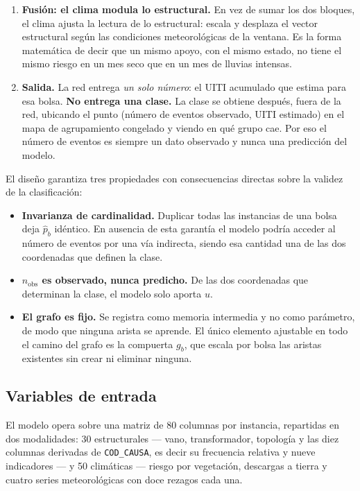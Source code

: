 \documentclass[11pt,a4paper]{article}
\begin{document}
\begin{bloquenuevo}
\begin{enumerate}[itemsep=0.3em]
  \item \textbf{Fusión: el clima modula lo estructural.} En vez de sumar los dos bloques, el
        clima ajusta la lectura de lo estructural: escala y desplaza el vector estructural
        según las condiciones meteorológicas de la ventana. Es la forma matemática de decir
        que un mismo apoyo, con el mismo estado, no tiene el mismo riesgo en un mes seco que
        en un mes de lluvias intensas.

  \item \textbf{Salida.} La red entrega \emph{un solo número}: el UITI acumulado que estima
        para esa bolsa. \textbf{No entrega una clase.} La clase se obtiene después, fuera de
        la red, ubicando el punto (número de eventos observado, UITI estimado) en el mapa de
        agrupamiento congelado y viendo en qué grupo cae. Por eso el número de eventos es
        siempre un dato observado y nunca una predicción del modelo.
\end{enumerate}
\end{bloquenuevo}

El diseño garantiza tres propiedades con consecuencias directas sobre la validez de la
clasificación:

\begin{itemize}
  \item \textbf{Invarianza de cardinalidad.} Duplicar todas las instancias de una bolsa deja
        $\hat{p}_b$ idéntico. En ausencia de esta garantía el modelo podría acceder al número
        de eventos por una vía indirecta, siendo esa cantidad una de las dos coordenadas que
        definen la clase.
  \item \textbf{$n_{\text{obs}}$ es observado, nunca predicho.} De las dos coordenadas que
        determinan la clase, el modelo solo aporta $u$.
  \item \textbf{El grafo es fijo.} Se registra como memoria intermedia y no como parámetro, de
        modo que ninguna arista se aprende. El único elemento ajustable en todo el camino del
        grafo es la compuerta $g_b$, que escala por bolsa las aristas existentes sin crear ni
        eliminar ninguna.
\end{itemize}

\subsection{Variables de entrada}

El modelo opera sobre una matriz de 80 columnas por instancia, repartidas en dos modalidades:
30 estructurales --- vano, transformador, topología y las diez columnas derivadas de
\texttt{COD\_CAUSA}, es decir su frecuencia relativa y nueve indicadores --- y 50 climáticas
--- riesgo por vegetación, descargas a tierra y cuatro series meteorológicas con doce rezagos
cada una.
\end{document}
